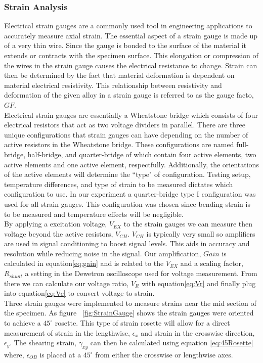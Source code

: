 \documentclass[12pt]{article}
\begin{document}
\subsubsection*{Strain Analysis}
Electrical strain gauges are a commonly used tool in engineering applications to accurately measure axial strain. The essential aspect of a strain gauge is made up of a very thin wire. Since the gauge is bonded to the surface of the material it extends or contracts with the specimen surface.  This elongation or compression of the wires in the strain gauge causes the electrical resistance to change. Strain can then be determined by the fact that material deformation is dependent on material electrical resistivity.  This relationship between resistivity and deformation of the given alloy in a strain gauge is referred to as the gauge facto, $GF$.  
\\
Electrical strain gauges are essentially a Wheatstone bridge which consists of four  electrical resistors that act as two voltage dividers in parallel. There are three unique configurations that strain gauges can have depending on the number of active resistors in the Wheatstone bridge. These configurations are named full-bridge, half-bridge, and quarter-bridge of which contain four active elements,  two active elements and one active element, respectfully. Additionally, the orientations of the active elements will determine the  ``type" of configuration. Testing setup, temperature differences, and type of strain to be measured dictates which configuration  to use.  In our experiment a quarter-bridge type I configuration was used for all strain gauges. This configuration was chosen since bending strain is to be measured and temperature effects will be negligible. 
\\
By applying a excitation voltage, $V_{EX} $ to the strain gauges we can measure then voltage  beyond the active resistors, $V_{CH} $.  $V_{CH}$ is typically  very small  so amplifiers are used in signal conditioning to boost signal levels. This aids in accuracy and resolution while reducing noise in the signal. Our amplification, $Gain$  is calculated in equation\ref{eq:gain}  and is related to the $V_{EX}$ and  a scaling factor, $R_{shunt}$ a setting in the Dewetron oscilloscope used  for voltage measurement.  From there we can calculate our voltage ratio, $V_{R}$ with equation\ref{eq:Vr}  and finally plug into equation\ref{eq:Ve} to convert voltage to strain.
\\
Three strain gauges were implemented to measure strains near the mid section of the specimen. As figure ~\ref{fig:StrainGauge} shows the strain gauges were oriented to achieve a $45^{\circ}$ rosette. This type of strain rosette  will allow for a direct measurement of strain in the lengthwise, $\epsilon_{x} $ and strain in the crosswise direction, $\epsilon_{y}$.  The shearing strain, $\gamma_{xy}$ can then be calculated using equation \ref{eq:45Rosette} where, $\epsilon_{OB} $ is placed at a $45^{\circ} $ from either the crosswise or lengthwise axes.
\end{document}
